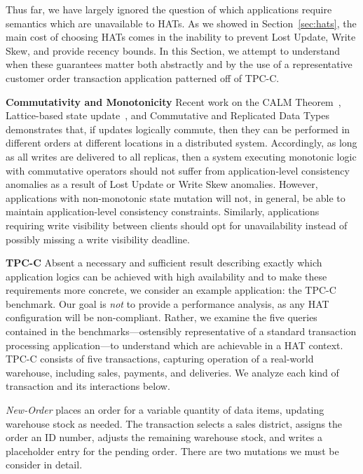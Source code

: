 Thus far, we have largely ignored the question of which applications
require semantics which are unavailable to HATs. As we showed in
Section~\ref{sec:hats}, the main cost of choosing HATs comes in the
inability to prevent Lost Update, Write Skew, and provide recency
bounds. In this Section, we attempt to understand when these
guarantees matter both abstractly and by the use of a representative
customer order transaction application patterned off of TPC-C.

\vspace{.5em}\noindent\textbf{Commutativity and Monotonicity} Recent work on
the CALM Theorem~\cite{calm}, Lattice-based state
update~\cite{blooml}, and Commutative and Replicated Data
Types~\cite{crdt} demonstrates that, if updates logically commute,
then they can be performed in different orders at different locations
in a distributed system. Accordingly, as long as all writes are
delivered to all replicas, then a system executing monotonic logic
with commutative operators should not suffer from application-level
consistency anomalies as a result of Lost Update or Write Skew
anomalies. However, applications with non-monotonic state mutation
will not, in general, be able to maintain application-level
consistency constraints. Similarly, applications requiring write
visibility between clients should opt for unavailability instead of
possibly missing a write visibility deadline.

\vspace{.5em}\noindent\textbf{TPC-C} Absent a necessary and sufficient result describing exactly which
application logics can be achieved with high availability and to make
these requirements more concrete, we consider an example application:
the TPC-C benchmark. Our goal is \textit{not} to provide a performance
analysis, as any HAT configuration will be non-compliant. Rather, we
examine the five queries contained in the benchmarks---ostensibly
representative of a standard transaction processing application---to
understand which are achievable in a HAT context. TPC-C consists of
five transactions, capturing operation of a real-world warehouse,
including sales, payments, and deliveries. We analyze each kind of
transaction and its interactions below.

\vspace{.5em}\noindent\textit{New-Order} places an order for a
variable quantity of data items, updating warehouse stock as
needed. The transaction selects a sales district, assigns the order an
ID number, adjusts the remaining warehouse stock, and writes a
placeholder entry for the pending order. There are two mutations we
must be consider in detail.

